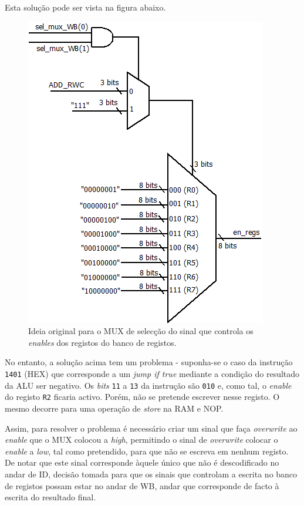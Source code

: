 \documentclass[11pt]{article}
\numberwithin{equation}{section}
\begin{document}
Esta solução pode ser vista na figura abaixo.

\begin{figure}[h]
	\centering
	\includegraphics[keepaspectratio=true, scale=0.35]{imagens/WB2}
	\caption{Ideia original para o MUX de selecção do sinal que controla os \textit{enables} dos registos do banco de registos.}
	\vspace{-0.8em}
\end{figure}

No entanto, a solução acima tem um problema - suponha-se o caso da instrução \texttt{1401} (HEX) que corresponde a um \textit{jump if true} mediante a condição do resultado da ALU ser negativo. Os \textit{bits} \texttt{11} a \texttt{13} da instrução são \texttt{010} e, como tal, o \textit{enable} do registo \texttt{R2} ficaria activo. Porém, não se pretende escrever nesse registo. O mesmo decorre para uma operação de \textit{store} na RAM e NOP. 

Assim, para resolver o problema é necessário criar um sinal que faça \textit{overwrite} ao \textit{enable} que o MUX colocou a \textit{high}, permitindo o sinal de \textit{overwrite} colocar o \textit{enable} a \textit{low}, tal como pretendido, para que não se escreva em nenhum registo. De notar que este sinal corresponde àquele único que não é descodificado no andar de ID, decisão tomada para que os sinais que controlam a escrita no banco de registos possam estar no andar de WB, andar que corresponde de facto à escrita do resultado final.
\end{document}
